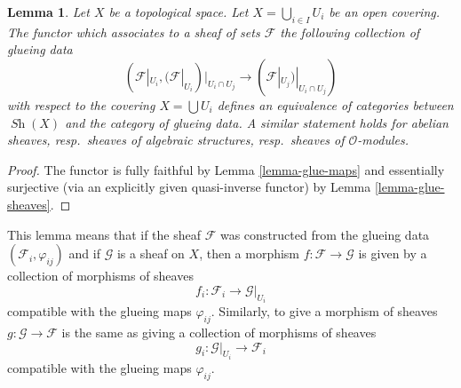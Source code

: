 \documentclass{stacks-project}
\theoremstyle{plain}
\newtheorem{lemma}[subsection]{Lemma}
\theoremstyle{definition}
\theoremstyle{remark}
\numberwithin{equation}{subsection}
\def\Sh{\mathop{\mathit{Sh}}\nolimits}
\begin{document}
\begin{lemma}
\label{lemma-mapping-property-glue}
Let $X$ be a topological space.
Let $X = \bigcup_{i\in I} U_i$ be an open covering.
The functor which associates to a sheaf of
sets $\mathcal{F}$ the following collection of
glueing data
$$
(\mathcal{F}|_{U_i},
(\mathcal{F}|_{U_i})|_{U_i \cap U_j}
\to
(\mathcal{F}|_{U_j})|_{U_i \cap U_j}
)
$$
with respect to the covering $X = \bigcup U_i$
defines an equivalence of categories between
$\Sh(X)$ and the category of glueing
data. A similar statement holds for
abelian sheaves, resp.\ sheaves of algebraic structures,
resp.\ sheaves of $\mathcal{O}$-modules.
\end{lemma}

\begin{proof}
The functor is fully faithful by
Lemma \ref{lemma-glue-maps}
and essentially surjective (via an explicitly given quasi-inverse functor) by
Lemma \ref{lemma-glue-sheaves}.
\end{proof}

\noindent
This lemma means that if the sheaf $\mathcal{F}$ was constructed
from the glueing data $(\mathcal{F}_i, \varphi_{ij})$
and if $\mathcal{G}$ is a sheaf on $X$, then a morphism
$f : \mathcal{F} \to \mathcal{G}$ is given by a collection of
morphisms of sheaves
$$
f_i : \mathcal{F}_i \longrightarrow \mathcal{G}|_{U_i}
$$
compatible with the glueing maps $\varphi_{ij}$. Similarly,
to give a morphism of sheaves $g : \mathcal{G} \to \mathcal{F}$
is the same as giving a collection of morphisms of sheaves
$$
g_i : \mathcal{G}|_{U_i} \longrightarrow \mathcal{F}_i
$$
compatible with the glueing maps $\varphi_{ij}$.








\end{document}
